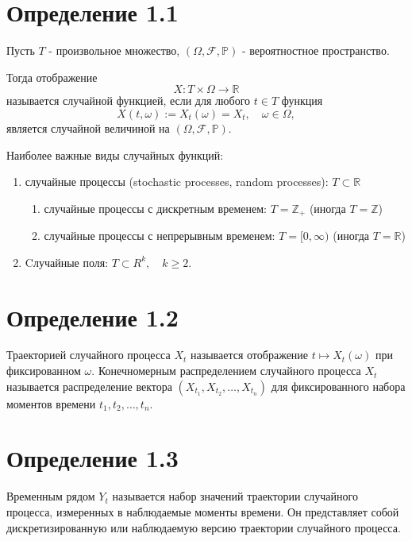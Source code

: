\section*{Определение 1.1}
Пусть \( T \) - произвольное множество, \( (\Omega, \mathcal{F},
\mathbb{P}) \) - вероятностное пространство.

Тогда отображение \[ X : T \times \Omega \to \mathbb{R} \] называется
случайной функцией, если для
любого \( t \in T \) функция \[ X(t, \omega) := X_t(\omega) = X_t,
\quad \omega \in \Omega, \]  является случайной величиной на \(
(\Omega, \mathcal{F}, \mathbb{P}) \).

Наиболее важные виды случайных функций:
\begin{enumerate}
  \item случайные процессы (stochastic processes, random processes):
    \( T \subset \mathbb{R} \)
    \begin{enumerate}
      \item случайные процессы с дискретным временем: \( T =
        \mathbb{Z}_+ \) (иногда \( T = \mathbb{Z} \))
      \item случайные процессы с непрерывным временем: \( T = [0,
        \infty) \) (иногда \( T = \mathbb{R} \))
    \end{enumerate}
  \item Cлучайные поля: \( T \subset R^k, \quad k \geq 2 \).
\end{enumerate}

\section*{Определение 1.2} Траекторией случайного процесса \( X_t
\) называется отображение \( t \mapsto X_t(\omega) \) при
фиксированном \( \omega \).
Конечномерным распределением случайного процесса \( X_t \)
называется распределение вектора \( (X_{t_1}, X_{t_2}, \ldots,
X_{t_n}) \) для фиксированного набора моментов
времени \( t_1, t_2, \ldots, t_n \).

\section*{Определение 1.3} Временным рядом \( Y_t \) называется
набор значений траектории случайного процесса,
измеренных в наблюдаемые моменты времени. Он представляет собой
дискретизированную или наблюдаемую версию траектории случайного процесса.

